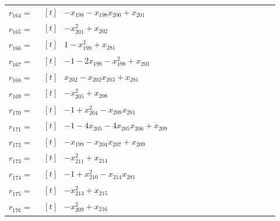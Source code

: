 \begin{longtable}{@{}r p{0.92\linewidth}@{}}
$r_{164}=$ & $\begin{aligned}[t]&-x_{198}-x_{198}x_{200}+x_{201}\end{aligned}$ \\[2pt]
$r_{165}=$ & $\begin{aligned}[t]&-x_{201}^{2}+x_{202}\end{aligned}$ \\[2pt]
$r_{166}=$ & $\begin{aligned}[t]&1-x_{199}^{2}+x_{281}\end{aligned}$ \\[2pt]
$r_{167}=$ & $\begin{aligned}[t]&-1-2x_{198}-x_{198}^{2}+x_{203}\end{aligned}$ \\[2pt]
$r_{168}=$ & $\begin{aligned}[t]&x_{202}-x_{202}x_{203}+x_{281}\end{aligned}$ \\[2pt]
$r_{169}=$ & $\begin{aligned}[t]&-x_{205}^{2}+x_{208}\end{aligned}$ \\[2pt]
$r_{170}=$ & $\begin{aligned}[t]&-1+x_{204}^{2}-x_{208}x_{281}\end{aligned}$ \\[2pt]
$r_{171}=$ & $\begin{aligned}[t]&-1-4x_{205}-4x_{205}x_{206}+x_{209}\end{aligned}$ \\[2pt]
$r_{172}=$ & $\begin{aligned}[t]&-x_{199}-x_{204}x_{207}+x_{209}\end{aligned}$ \\[2pt]
$r_{173}=$ & $\begin{aligned}[t]&-x_{211}^{2}+x_{214}\end{aligned}$ \\[2pt]
$r_{174}=$ & $\begin{aligned}[t]&-1+x_{210}^{2}-x_{214}x_{281}\end{aligned}$ \\[2pt]
$r_{175}=$ & $\begin{aligned}[t]&-x_{213}^{2}+x_{215}\end{aligned}$ \\[2pt]
$r_{176}=$ & $\begin{aligned}[t]&-x_{209}^{2}+x_{216}\end{aligned}$ \\[2pt]

\end{longtable}
